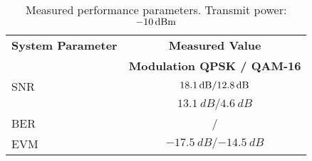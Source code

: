 \begin{table}[htbp]
  \centering
  \caption{Measured performance parameters. Transmit power: $\SI{\measPWR}{\decibel m}$}
    \begin{tabular}{lc}
    \rowcolor[rgb]{ 0,  0,  0} \textcolor[rgb]{ 1,  1,  1}{\textbf{System Parameter}}	& \textcolor[rgb]{ 1,  1,  1}{\textbf{Measured Value}} 		\\
    \rowcolor[rgb]{ 0,  0,  0} \textcolor[rgb]{ 1,  1,  1}{} & \textcolor[rgb]{ 1,  1,  1}{\textbf{Modulation QPSK / QAM-16}}					\\
    	SNR 													& $\SI{18.1}{dB} / \SI{12.8}{dB}$							\\
	\ebnot 													& $\SI{13.1}{dB} /\SI{4.6}{dB}$							\\
    	BER			 											& \measBERQPSKGood / \measBERQAMGood 		\\
	EVM 													& $\SI{-17.5}{dB} / \SI{-14.5}{dB}$							\\

 \end{tabular}
  \label{tab:meas_params_good}
\end{table}